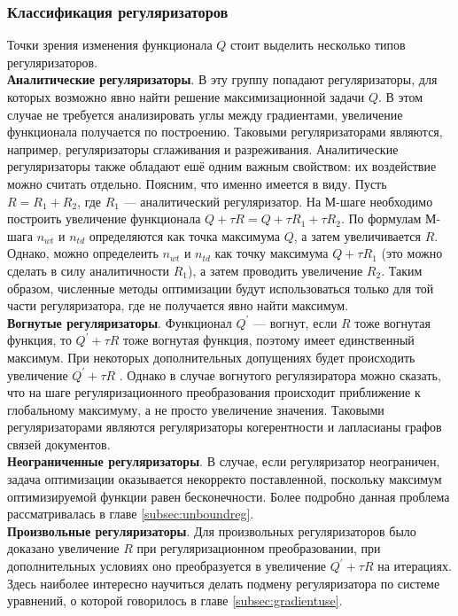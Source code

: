 \documentclass[12pt]{article}
\begin{document}
           \subsubsection{Классификация регуляризаторов}
Точки зрения изменения функционала $Q$ стоит выделить несколько типов регуляризаторов.\\
	 \textbf{Аналитические регуляризаторы}. В эту группу попадают регуляризаторы, для которых возможно явно найти решение максимизационной задачи $Q$. В этом случае не требуется анализировать углы между градиентами, увеличение функционала получается по построению. Таковыми регуляризаторами являются, например, регуляризаторы сглаживания и разреживания. Аналитические регуляризаторы также обладают ешё одним важным свойством: их воздействие можно считать отдельно. Поясним, что именно имеется в виду. Пусть $R = R_1 + R_2$, где $R_1$ --- аналитический регуляризатор. На М-шаге необходимо построить увеличение функционала $Q + \tau R = Q + \tau R_1 + \tau R_2$. По формулам М-шага $n_{wt}$ и $n_{td}$ определяются как точка максимума $Q$, а затем увеличивается $R$.  Однако, можно определеить $n_{wt}$ и $n_{td}$ как точку максимума $Q + \tau R_1 $ (это можно сделать в силу аналитичности $R_1$), а затем проводить увеличение $R_2$. Таким образом,  численные методы оптимизации будут использоваться только для той части регуляризатора, где не получается явно найти максимум.\\
	\textbf{Вогнутые регуляризаторы}. Функционал $Q^{\prime}$ --- вогнут, если $R$ тоже вогнутая функция, то $Q^{\prime} + \tau R$ тоже вогнутая функция, поэтому имеет единственный максимум. При некоторых  дополнительных допущениях будет происходить увеличение $Q^{\prime} + \tau R$ . Однако в случае вогнутого регулязиратора можно сказать, что на шаге регуляризационного преобразования происходит приближение к глобальному максимуму, а не просто увеличение значения. Таковыми регуляризаторами являются регуляризаторы когерентности и лапласианы графов связей документов.\\
	\textbf{Неограниченные регуляризаторы}. В случае, если регуляризатор неограничен, задача оптимизации оказывается некорректо поставленной, поскольку максимум оптимизируемой функции равен бесконечности. Более подробно данная проблема  рассматривалась в главе \ref{subsec:unboundreg}.\\
	\textbf{Произвольные регуляризаторы}. Для произвольных регуляризаторов было доказано увеличение $R$ при регуляризационном преобразовании, при дополнительных условиях оно преобразуется в увеличение $Q^{\prime} + \tau R$ на итерациях. Здесь наиболее интересно научиться делать подмену регуляризатора по системе уравнений, о которой говорилось в главе \ref{subsec:gradientuse}.
\end{document}
